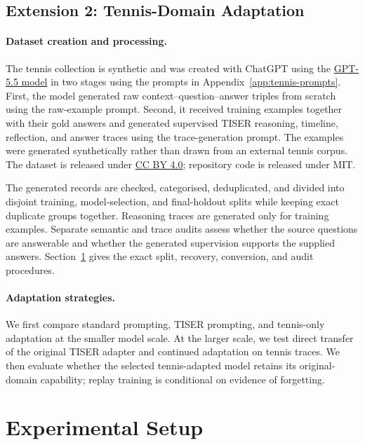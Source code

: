 \documentclass[conference]{IEEEtran}
\begin{document}
\subsection{Extension 2: Tennis-Domain Adaptation}

\paragraph{Dataset creation and processing.}
The tennis collection is synthetic and was created with ChatGPT using the \href{https://developers.openai.com/api/docs/models/gpt-5.5}{GPT-5.5 model} in two stages using the prompts in Appendix~\ref{app:tennis-prompts}. First, the model generated raw context--question--answer triples from scratch using the raw-example prompt. Second, it received training examples together with their gold answers and generated supervised TISER reasoning, timeline, reflection, and answer traces using the trace-generation prompt. The examples were generated synthetically rather than drawn from an external tennis corpus. The dataset is released under \href{https://creativecommons.org/licenses/by/4.0/}{CC BY 4.0}; repository code is released under MIT.

The generated records are checked, categorised, deduplicated, and divided into disjoint training, model-selection, and final-holdout splits while keeping exact duplicate groups together. Reasoning traces are generated only for training examples. Separate semantic and trace audits assess whether the source questions are answerable and whether the generated supervision supports the supplied answers. Section~\ref{sec:experimental-setup} gives the exact split, recovery, conversion, and audit procedures.

\paragraph{Adaptation strategies.}
We first compare standard prompting, TISER prompting, and tennis-only adaptation at the smaller model scale. At the larger scale, we test direct transfer of the original TISER adapter and continued adaptation on tennis traces. We then evaluate whether the selected tennis-adapted model retains its original-domain capability; replay training is conditional on evidence of forgetting.

\section{Experimental Setup}
\label{sec:experimental-setup}
\end{document}
